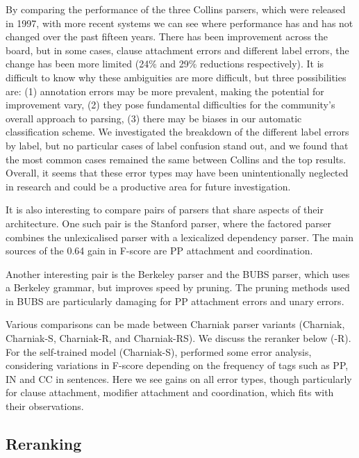 By comparing the performance of the three Collins parsers, which were released in 1997, with more recent systems we can see where performance has and has not changed over the past fifteen years.
There has been improvement across the board, but in some cases, \myeg clause attachment errors and different label errors, the change has been more limited (24\% and 29\% reductions respectively).
It is difficult to know why these ambiguities are more difficult, but three possibilities are:
(1) annotation errors may be more prevalent, making the potential for improvement vary,
(2) they pose fundamental difficulties for the community's overall approach to parsing,
(3) there may be biases in our automatic classification scheme.
We investigated the breakdown of the different label errors by label, but no particular cases of label confusion stand out, and we found that the most common cases remained the same between Collins and the top results.
Overall, it seems that these error types may have been unintentionally neglected in research and could be a productive area for future investigation.

It is also interesting to compare pairs of parsers that share aspects of their
architecture.  One such pair is the Stanford parser, where the factored parser
combines the unlexicalised parser with a lexicalized dependency parser.  The
main sources of the 0.64 gain in F-score are PP attachment and coordination.

Another interesting pair is the Berkeley parser and the BUBS parser, which uses
a Berkeley grammar, but improves speed by pruning.  The pruning methods used in
BUBS are particularly damaging for PP attachment errors and unary errors.

Various comparisons can be made between Charniak parser variants (Charniak, Charniak-S, Charniak-R, and Charniak-RS).
We discuss the reranker below (-R).
For the self-trained model (Charniak-S), \textcite{McClosky-Charniak-Johnson:2006} performed some error analysis,
considering variations in F-score depending on the frequency of tags such as
PP, IN and CC in sentences.  Here we see gains on all error types, though
particularly for clause attachment, modifier attachment and coordination, which
fits with their observations.

\subsection{Reranking}

